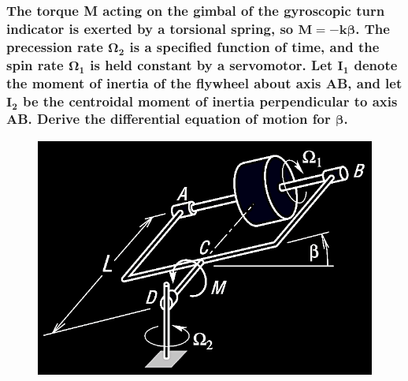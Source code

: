\documentclass[12pt, letterpaper]{../assignment}
\begin{document}
\subsubsection*{The torque M acting on the gimbal of the gyroscopic turn indicator is exerted by a torsional spring, so $\bm{M = -k\beta}$.
The precession rate $\bm{\Omega_2}$ is a specified function of time,
and the spin rate $\bm{\Omega_1}$ is held constant by a servomotor.
Let $\bm{I_1}$ denote the moment of inertia of the flywheel about axis AB,
and let $\bm{I_2}$ be the centroidal moment of inertia perpendicular to axis AB.
Derive the differential equation of motion for $\bm{\beta}$.}

\begin{figure}[H]
    \centering
    \includegraphics[scale=0.7,frame]{images/Q6_8.png}
\end{figure}


\end{document}
